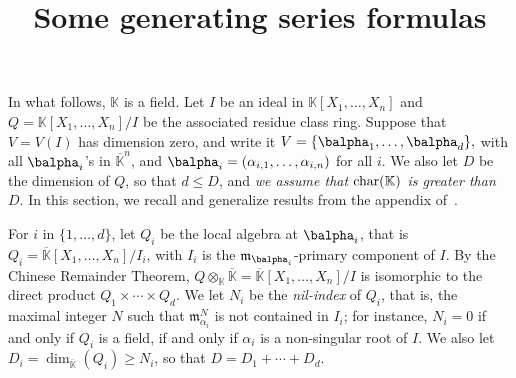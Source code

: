 \documentclass[12pt]{article}
\title{Some generating series formulas}
\date{}
\def\K {\ensuremath{\mathbb{K}}}
\def\Kbar {{\ensuremath{\overline{\mathbb{K}}}}}
\def\D {\ensuremath{D}}
\def\m {\ensuremath{\mathfrak{m}}}
\newtheorem{Lemma}{Lemma}
\begin{document}
\maketitle

In what follows, $\K$ is a field.  Let $I$ be an ideal in
$\K[X_1,\dots,X_n]$ and $Q=\K[X_1,\dots,X_n]/I$ be the associated
residue class ring. Suppose that $V=V(I)$ has dimension zero, and
write it $V=\{\balpha_1,\dots,\balpha_d\},$ with all $\balpha_i$'s in
$\Kbar^n$, and $\balpha_i=(\alpha_{i,1},\dots,\alpha_{i,n})$ for all
$i$.  We also let $\D$ be the dimension of $Q$, so that $d \le \D$,
and {\em we assume that ${\rm char}(\K)$ is greater than $D$}. In this
section, we recall and generalize results from the appendix
of~\cite{BoSaSc03}.

For $i$ in $\{1,\dots,d\}$, let $Q_i$ be the local algebra at
$\balpha_i$, that is $Q_i=\Kbar[X_1,\dots,X_n]/I_i$, with $I_i$ is the
$\m_{\balpha_i}$-primary component of $I$. By the Chinese Remainder
Theorem, $Q\otimes_\K \Kbar=\Kbar[X_1,\dots,X_n]/I$ is isomorphic to
the direct product $Q_1\times \cdots \times Q_d$.  We let $N_i$ be the
{\em nil-index} of $Q_i$, that is, the maximal integer $N$ such that
$\m_{\alpha_i}^N$ is not contained in $I_i$; for instance, $N_i=0$ if
and only if $Q_i$ is a field, if and only if $\alpha_i$ is a
non-singular root of $I$. We also let
$\D_i=\dim_\Kbar(Q_i) \ge N_i$, so that $\D=\D_1 + \cdots + \D_d$.



\end{document}
